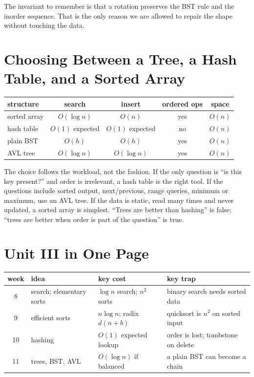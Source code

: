 \documentclass[11pt]{article}
\theoremstyle{definition}
\begin{document}
The invariant to remember is that a rotation preserves the BST rule and the
inorder sequence. That is the only reason we are allowed to repair the shape
without touching the data.

\section{Choosing Between a Tree, a Hash Table, and a Sorted Array}

\begin{center}
{\footnotesize
\begin{tabular}{l c c c c}
  \toprule
  \textbf{structure} & \textbf{search} & \textbf{insert} & \textbf{ordered ops} & \textbf{space} \\
  \midrule
  sorted array & $O(\log n)$ & $O(n)$ & yes & $O(n)$ \\
  hash table   & $O(1)$ expected & $O(1)$ expected & no & $O(n)$ \\
  plain BST    & $O(h)$ & $O(h)$ & yes & $O(n)$ \\
  AVL tree     & $O(\log n)$ & $O(\log n)$ & yes & $O(n)$ \\
  \bottomrule
\end{tabular}}
\end{center}

The choice follows the workload, not the fashion. If the only question is
``is this key present?'' and order is irrelevant, a hash table is the right
tool. If the questions include sorted output, next/previous, range queries,
minimum or maximum, use an AVL tree. If the data is static, read many times
and never updated, a sorted array is simplest. ``Trees are better than
hashing'' is false; ``trees are better when order is part of the question'' is
true.

\section{Unit III in One Page}

\begin{center}
{\footnotesize
\begin{tabular}{c l l l}
  \toprule
  \textbf{week} & \textbf{idea} & \textbf{key cost} & \textbf{key trap} \\
  \midrule
  8 & search; elementary sorts &
    $\log n$ search; $n^2$ sorts & binary search needs sorted data \\
  9 & efficient sorts &
    $n\log n$; radix $d(n+b)$ & quicksort is $n^2$ on sorted input \\
  10 & hashing &
    $O(1)$ expected lookup & order is lost; tombstone on delete \\
  11 & trees, BST, AVL &
    $O(\log n)$ if balanced & a plain BST can become a chain \\
  \bottomrule
\end{tabular}}
\end{center}
\end{document}
